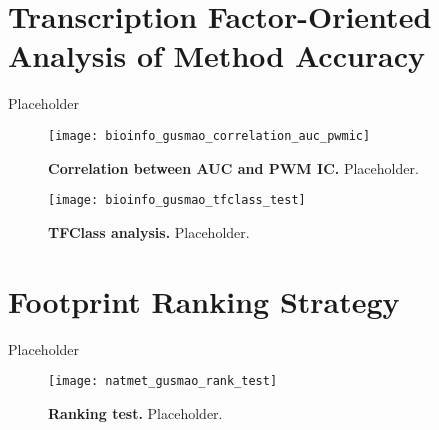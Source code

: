 \section{Transcription Factor-Oriented Analysis of Method Accuracy}
\label{sec:tf.analysis.accuracy}

Placeholder

\begin{figure}[h!]
\centering
\texttt{[image: bioinfo\_gusmao\_correlation\_auc\_pwmic]}
\caption[Correlation between AUC and PWM IC]{\textbf{Correlation between AUC and PWM IC.} Placeholder.}
\label{fig:bioinfo_gusmao_correlation_auc_pwmic}
\end{figure}

\begin{figure}[h!]
\centering
\texttt{[image: bioinfo\_gusmao\_tfclass\_test]}
\caption[TFClass analysis]{\textbf{TFClass analysis.} Placeholder.}
\label{fig:bioinfo_gusmao_tfclass_test}
\end{figure}


\section{Footprint Ranking Strategy}
\label{sec:footprint.ranking.strategy}

Placeholder

\begin{figure}[h!]
\centering
\texttt{[image: natmet\_gusmao\_rank\_test]}
\caption[Ranking test]{\textbf{Ranking test.} Placeholder.}
\label{fig:natmet_gusmao_rank_test}
\end{figure}


